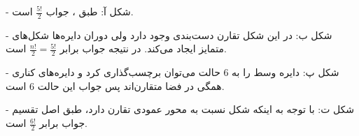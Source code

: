 -
شکل
آ:
\p
طبق  ،
جواب 
$\frac{5!}{2}$
است.

-
شکل
ب:
\p
در این شکل تقارن دست‌بندی وجود دارد ولی دوران دایره‌ها شکل‌های متمایز ایجاد می‌کند.
در نتیجه جواب برابر
$\frac{n!}{2} = \frac{5!}{2}$
است.

-
شکل
پ:
\p
دایره وسط را به 6 حالت می‌توان برچسب‌گذاری کرد و دایره‌های کناری همگی در فضا متقارن‌اند پس جواب این حالت 6 است.

-
شکل 
ت:
\p
با توجه به اینکه شکل نسبت به محور عمودی تقارن دارد، طبق اصل تقسیم جواب برابر 
$\frac{6!}{2}$
است.